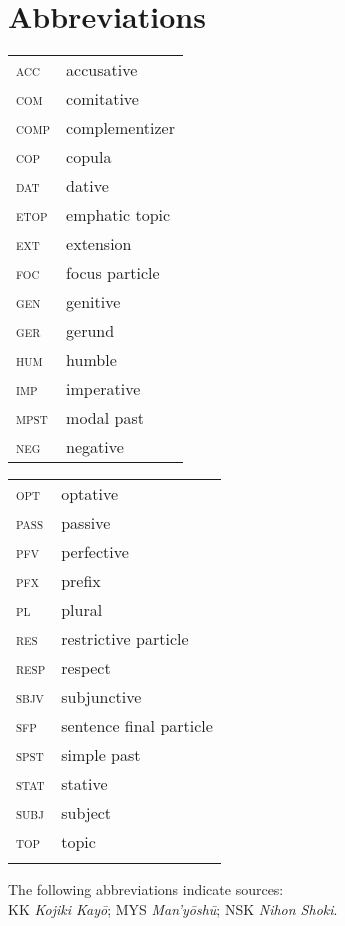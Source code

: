 \documentclass[output=paper]{LSP/langsci}
\begin{document}
\section*{Abbreviations}
\begin{tabularx}{.45\textwidth}{lQ}
\textsc{acc} & accusative\\
\textsc{com} & comitative\\
\textsc{comp} & complementizer\\
\textsc{cop} & copula\\
\textsc{dat} & dative\\
\textsc{etop} & emphatic topic\\
\textsc{ext} &  extension\\
\textsc{foc} & focus particle\\
\textsc{gen} & genitive\\
\textsc{ger} & gerund\\
\textsc{hum} & humble\\
 \textsc{imp} & imperative\\
\textsc{mpst} & modal past\\
\textsc{neg} & negative\\

\end{tabularx}
\begin{tabularx}{.45\textwidth}{lQ}
\textsc{opt} & optative\\
\textsc{pass} & passive\\
\textsc{pfv} & perfective\\
\textsc{pfx} & prefix\\
\textsc{pl} & plural\\
\textsc{res} & restrictive  particle\\
\textsc{resp} & respect\\
\textsc{sbjv} & subjunctive\\
\textsc{sfp} & sentence final particle\\
\textsc{spst} & simple  past\\
\textsc{stat} & stative\\
\textsc{subj} & subject\\
\textsc{top} & topic\\
\\
\end{tabularx}
\bigskip

\noindent
The following abbreviations indicate sources:\\
 KK \textit{Kojiki Kayō}; MYS \textit{Man'yōshū}; NSK \textit{Nihon Shoki}.

{\sloppy
\printbibliography[heading=subbibliography,notkeyword=this] }
\end{document}

